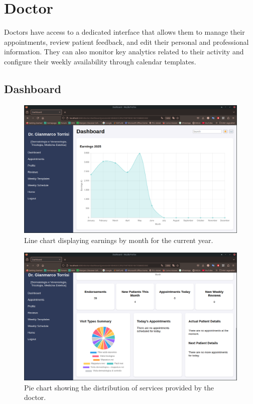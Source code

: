 \section{Doctor}

Doctors have access to a dedicated interface that allows them to manage their appointments, review patient feedback, and edit their personal and professional information. They can also monitor key analytics related to their activity and configure their weekly availability through calendar templates.

\subsection{Dashboard}

\begin{figure}[!h]
	\centering
	\includegraphics[scale=0.30]{resources/screenshots/doctor_ui/earnings_linechart.png}
	\caption{Line chart displaying earnings by month for the current year.}
	\label{fig:earnings_linechart}
\end{figure}

\begin{figure}[!h]
	\centering
	\includegraphics[scale=0.30]{resources/screenshots/doctor_ui/dashboard_bottom.png}
	\caption{Pie chart showing the distribution of services provided by the doctor.}
	\label{fig:services_piechart}
\end{figure}

